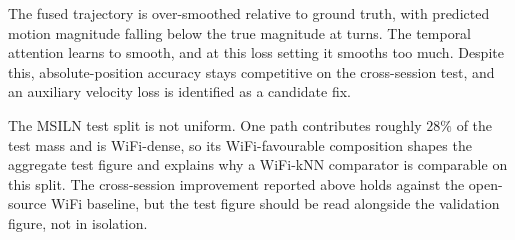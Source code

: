 The fused trajectory is over-smoothed relative to ground truth, with predicted
motion magnitude falling below the true magnitude at turns. The temporal
attention learns to smooth, and at this loss setting it smooths too much.
Despite this, absolute-position accuracy stays competitive on the cross-session
test, and an auxiliary velocity loss is identified as a candidate fix.

The MSILN test split is not uniform. One path contributes roughly $28\%$ of the
test mass and is WiFi-dense, so its WiFi-favourable composition shapes the
aggregate test figure and explains why a WiFi-kNN comparator is comparable on
this split. The cross-session improvement reported above holds against the
open-source WiFi baseline, but the test figure should be read alongside the
validation figure, not in isolation.
